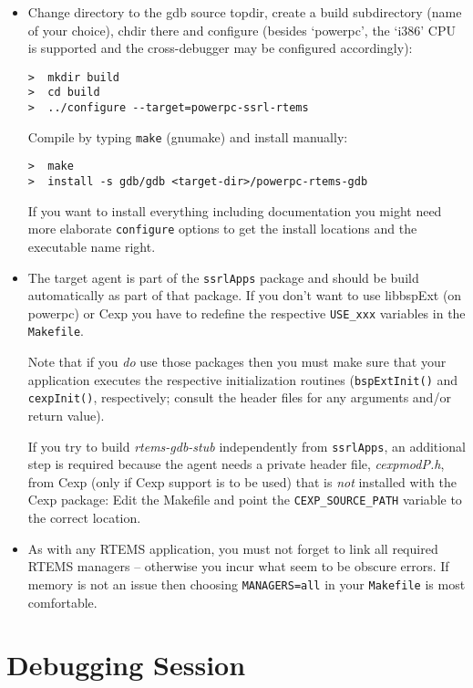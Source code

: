 \documentclass{article}
\begin{document}
\begin{itemize}
\item
  Change directory to the gdb source topdir, create a build
  subdirectory (name of your choice), chdir there and configure
  (besides `powerpc', the `i386' CPU is supported and the
  cross-debugger may be configured accordingly):
\begin{verbatim}
>  mkdir build
>  cd build
>  ../configure --target=powerpc-ssrl-rtems  
\end{verbatim}

  Compile by typing {\tt make} (gnumake) and install manually:
\begin{verbatim}
>  make
>  install -s gdb/gdb <target-dir>/powerpc-rtems-gdb
\end{verbatim}

  If you want to install everything including documentation you
  might need more elaborate {\tt configure} options to get the
  install locations and the executable name right.
  
\item
  The target agent is part of the {\tt ssrlApps} package and
  should be build automatically as part of that package.
  If you don't want to use libbspExt (on powerpc) or Cexp
  you have to redefine the respective {\tt USE\_xxx} variables
  in the {\tt Makefile}.

  Note that if you {\em do\/} use those packages then you must
  make sure that your application executes the respective initialization
  routines ({\tt bspExtInit()} and {\tt cexpInit()}, respectively;
  consult the header files for any arguments and/or return value).

  If you try to build {\em rtems-gdb-stub} independently from
  {\tt ssrlApps}, an additional step is required because
  the agent needs a private header file, {\em cexpmodP.h},
  from Cexp (only if Cexp support is to be used) that is {\em not}
  installed with the Cexp package: Edit the Makefile
  and point the {\tt CEXP\_SOURCE\_PATH} variable to the
  correct location.

\item
  As with any RTEMS application, you must not forget to link all
  required RTEMS managers -- otherwise you incur what seem to be
  obscure errors. If memory is not an issue then choosing
  {\tt MANAGERS=all} in your {\tt Makefile} is most comfortable.
  
\end{itemize}

\section{Debugging Session}
\end{document}
